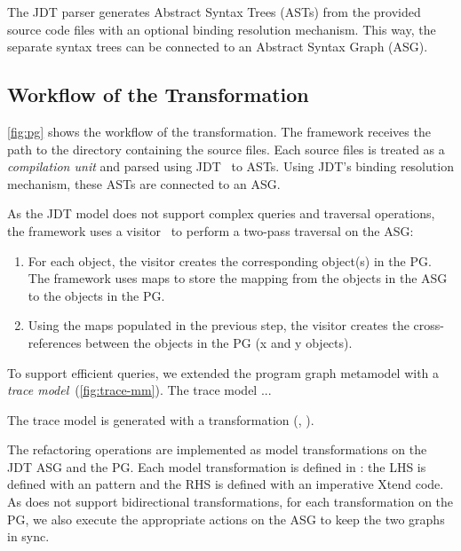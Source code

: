 \documentclass[submission,copyright,creativecommons]{eptcs}
\begin{document}
The JDT parser generates Abstract Syntax Trees (ASTs) from the provided source code files with an optional binding resolution mechanism. This way, the separate syntax trees can be connected to an Abstract Syntax Graph (ASG).

\subsection{Workflow of the Transformation}


\autoref{fig:pg} shows the workflow of the transformation. The framework receives the path to the directory containing the source files. Each source files is treated as a \emph{compilation unit} and parsed using JDT~ to ASTs. Using JDT's binding resolution mechanism, these ASTs are connected to an ASG.

As the JDT model does not support complex queries and traversal operations, the framework uses a visitor~ to perform a two-pass traversal on the ASG:

\begin{enumerate}[noitemsep]
\item For each object, the visitor creates the corresponding object(s) in the PG. The framework uses maps to store the mapping from the objects in the ASG to the objects in the PG.
\item Using the maps populated in the previous step, the visitor creates the cross-references between the objects in the PG (\eg x and y objects).
\end{enumerate}

To support efficient queries, we extended the program graph metamodel with a \emph{trace model}~(\autoref{fig:trace-mm}).  The trace model ...

The trace model is generated with a \viatra transformation (, ).

The refactoring operations are implemented as model transformations on the JDT ASG and the PG. Each model transformation is defined in \viatra: the LHS is defined with an \eiq pattern and the RHS is defined with an imperative Xtend code. As \viatra does not support bidirectional transformations, for each transformation on the PG, we also execute the appropriate actions on the ASG to keep the two graphs in sync.

\end{document}
